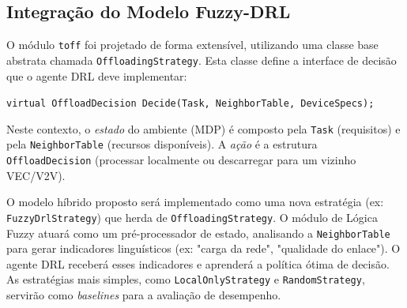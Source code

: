 \subsection{Integração do Modelo Fuzzy-DRL}
O módulo \texttt{toff} foi projetado de forma extensível, utilizando uma classe base abstrata chamada \texttt{OffloadingStrategy}. Esta classe define a interface de decisão que o agente DRL deve implementar:
\begin{center}
    \texttt{virtual OffloadDecision Decide(Task, NeighborTable, DeviceSpecs);}
\end{center}
Neste contexto, o \textit{estado} do ambiente (MDP) é composto pela \texttt{Task} (requisitos) e pela \texttt{NeighborTable} (recursos disponíveis). A \textit{ação} é a estrutura \texttt{OffloadDecision} (processar localmente ou descarregar para um vizinho VEC/V2V).

O modelo híbrido proposto será implementado como uma nova estratégia (ex: \texttt{FuzzyDrlStrategy}) que herda de \texttt{OffloadingStrategy}. O módulo de Lógica Fuzzy atuará como um pré-processador de estado, analisando a \texttt{NeighborTable} para gerar indicadores linguísticos (ex: "carga da rede", "qualidade do enlace"). O agente DRL receberá esses indicadores e aprenderá a política ótima de decisão. As estratégias mais simples, como \texttt{LocalOnlyStrategy} e \texttt{RandomStrategy}, servirão como \textit{baselines} para a avaliação de desempenho.



